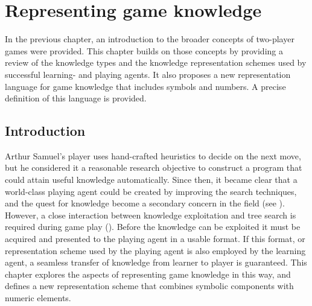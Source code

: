 

\chapter{Representing game knowledge}
\label{chap:kr}
{\chapterintro
In the previous chapter, an introduction to the broader concepts of two-player games were provided.  This chapter builds on those concepts by providing a review of the knowledge types and the knowledge representation schemes used by successful learning- and playing agents.  It also proposes a new representation language for game knowledge that includes symbols and numbers. A precise definition of this language is provided.}

\section{Introduction}
\label{sec:knowledge-intro}
Arthur Samuel's  player \cite{samuel:checkers} uses hand-crafted heuristics to decide on the next move, but he considered it a reasonable research objective to construct a program that could attain useful knowledge automatically.  Since then, it became clear that a world-class playing agent could be created by improving the search techniques, and the quest for knowledge become a secondary concern in the field (see ).  However, a close interaction between knowledge exploitation and tree search is required during game play ().  Before the knowledge can be exploited it must be acquired and presented to the playing agent in a usable format.  If this format, or representation scheme used by the playing agent is also employed by the learning agent, a seamless transfer of knowledge from learner to player is guaranteed.  This chapter explores the aspects of representing game knowledge in this way, and defines a new representation scheme that combines symbolic components with numeric elements.

